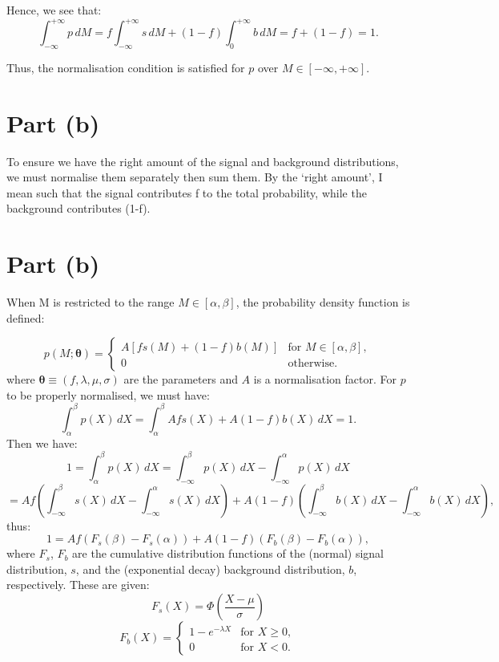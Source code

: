 \documentclass{article}
\begin{document}
Hence, we see that:
\[ 
\int_{-\infty}^{+\infty} p \, dM = 
f\int_{-\infty}^{+\infty} s \, dM + 
(1-f)\int_{0}^{+\infty} b \, dM =
f + (1-f) = 1.
\]

Thus, the normalisation condition is satisfied for $p$ over $M \in [-\infty, +\infty]$.

\section*{Part (b)}

To ensure we have the right amount of the signal and background distributions, we must normalise them separately then sum them. By the ‘right amount’, I mean such that the signal contributes f to the total probability, while the background contributes (1-f).

\section*{Part (b)}

When M is restricted to the range $M \in [\alpha, \beta]$, the probability density function is defined:

\[ 
p(M; \boldsymbol{\theta}) = 
\begin{cases} 
A[fs(M) + (1-f)b(M)] & \text{for } M \in [\alpha, \beta], \\
0 & \text{otherwise}.
\end{cases}
\]
where $\boldsymbol{\theta} \equiv (f, \lambda, \mu, \sigma)$ are the parameters and $A$ is a normalisation factor. For $p$ to be properly normalised, we must have:
\[
\int_{\alpha}^{\beta} p(X) \, dX =
\int_{\alpha}^{\beta} Afs(X) + A(1-f)b(X) \, dX = 1.
\]
Then we have:
\[
1 = \int_{\alpha}^{\beta} p(X) \, dX = 
\int_{-\infty}^{\beta} p(X) \, dX - \int_{-\infty}^{\alpha} p(X) \, dX
\]
\[
= Af \left( \int_{-\infty}^{\beta} s(X) \, dX - \int_{-\infty}^{\alpha} s(X) \, dX \right) +
A(1-f)\left( \int_{-\infty}^{\beta} b(X) \, dX - \int_{-\infty}^{\alpha} b(X) \, dX \right),
\]
thus:
\[
1 = Af \left( F_s(\beta) - F_s(\alpha) \right) +
A(1-f)\left( F_b(\beta) - F_b(\alpha) \right),
\]
where $F_s$, $F_b$ are the cumulative distribution functions of the (normal) signal distribution, $s$, and the (exponential decay) background distribution, $b$, respectively. These are given:
\[
F_s(X) = \Phi(\frac{X-\mu}{\sigma})
\]
\[
F_b(X) = 
\begin{cases} 
1 - e^{-\lambda X} & \text{for } X \geq 0, \\
0 & \text{for } X < 0.
\end{cases}
\]
\end{document}
